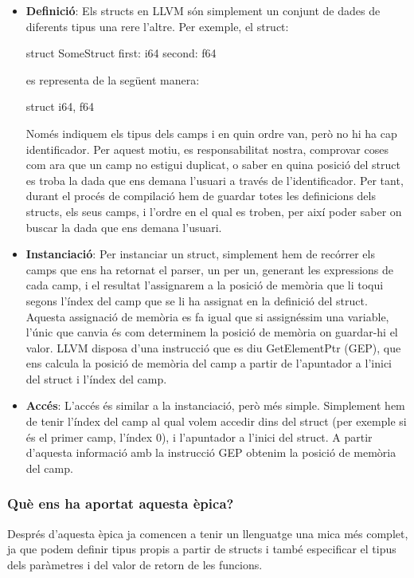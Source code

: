 ﻿\documentclass{article}
\begin{document}
\begin{itemize}
\item \textbf{Definició}: Els structs en LLVM són simplement un conjunt
    de dades de diferents tipus una rere l'altre. Per exemple, el struct:

    \begin{code}
        struct SomeStruct {
            first: i64
            second: f64
        }
    \end{code}

    es representa de la següent manera:

    \begin{code}
        struct { i64, f64 }
    \end{code}

    Només indiquem els tipus dels camps i en quin ordre van, però no hi ha cap
    identificador. Per aquest motiu, es responsabilitat nostra, comprovar coses
    com ara que un camp no estigui duplicat, o saber en quina posició del struct
    es troba la dada que ens demana l'usuari a través de l'identificador. Per
    tant, durant el procés de compilació hem de guardar totes les definicions
    dels structs, els seus camps, i l'ordre en el qual es troben, per així poder
    saber on buscar la dada que ens demana l'usuari.

\item \textbf{Instanciació}: Per instanciar un struct, simplement hem de recórrer
    els camps que ens ha retornat el parser, un per un, generant les expressions
    de cada camp, i el resultat l'assignarem a la posició de memòria que li
    toqui segons l'índex del camp que se li ha assignat en la definició del
    struct. Aquesta assignació de memòria es fa igual que si assignéssim una
    variable, l'únic que canvia és com determinem la posició de memòria on
    guardar-hi el valor. LLVM disposa d'una instrucció que es diu GetElementPtr
    (GEP), que ens calcula la posició de memòria del camp a partir de
    l'apuntador a l'inici del struct i l'índex del camp.

\item \textbf{Accés}: L'accés és similar a la instanciació, però més simple.
    Simplement hem de tenir l'índex del camp al qual volem accedir dins del
    struct (per exemple si és el primer camp, l'índex 0), i l'apuntador a
    l'inici del struct. A partir d'aquesta informació amb la instrucció GEP
    obtenim la posició de memòria del camp.
\end{itemize}

\subsubsection{Què ens ha aportat aquesta èpica?}
Després d'aquesta èpica ja comencen a tenir un llenguatge una mica més complet,
ja que podem definir tipus propis a partir de structs i també especificar el tipus
dels paràmetres i del valor de retorn de les funcions.
\end{document}
